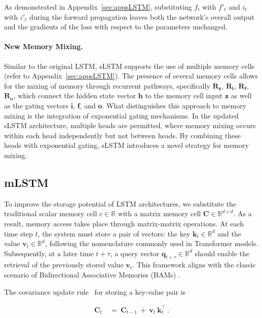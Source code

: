 As demonstrated in Appendix~\ref{sec:appsLSTM}, substituting $f_t$ with $f'_t$ and $i_t$ with $i'_t$ during the forward propagation leaves both the network's overall output and the gradients of the loss with respect to the parameters unchanged.

\paragraph{New Memory Mixing.} Similar to the original LSTM, sLSTM supports the use of multiple memory cells (refer to Appendix~\ref{sec:appsLSTM}). The presence of several memory cells allows for the mixing of memory through recurrent pathways, specifically $\mathbf{R}_{\mathbf{z}}$, $\mathbf{R}_{\mathbf{i}}$, $\mathbf{R}_{\mathbf{f}}$, $\mathbf{R}_{\mathbf{o}}$, which connect the hidden state vector $\mathbf{h}$ to the memory cell input $\mathbf{z}$ as well as the gating vectors $\mathbf{i}$, $\mathbf{f}$, and $\mathbf{o}$. What distinguishes this approach to memory mixing is the integration of exponential gating mechanisms. In the updated sLSTM architecture, multiple heads are permitted, where memory mixing occurs within each head independently but not between heads. By combining these heads with exponential gating, sLSTM introduces a novel strategy for memory mixing.

\subsection{mLSTM}
\label{sec:mLSTM}

To improve the storage potential of LSTM architectures, we substitute the traditional scalar memory cell $c \in \mathbb{R}$ with a matrix memory cell $\mathbf{C} \in \mathbb{R}^{d \times d}$. As a result, memory access takes place through matrix-matrix operations. At each time step $t$, the system must store a pair of vectors: the key $\mathbf{k}_t \in \mathbb{R}^d$ and the value $\mathbf{v}_t \in \mathbb{R}^d$, following the nomenclature commonly used in Transformer models. Subsequently, at a later time $t + \tau$, a query vector $\mathbf{q}_{t+\tau} \in \mathbb{R}^d$ should enable the retrieval of the previously stored value $\mathbf{v}_t$. This framework aligns with the classic scenario of Bidirectional Associative Memories (BAMs) \citep{Kohonen:72,Anderson:72,Nakano:72,Anderson:77}.

The covariance update rule~\citep{Sejnowski:77,Dayan:91} for storing a key-value pair is

\begin{align}
\mathbf{C}_t \ &= \ \mathbf{C}_{t-1} \ + \ \mathbf{v}_{t} \ \mathbf{k}_t^\top \ .
\end{align}

